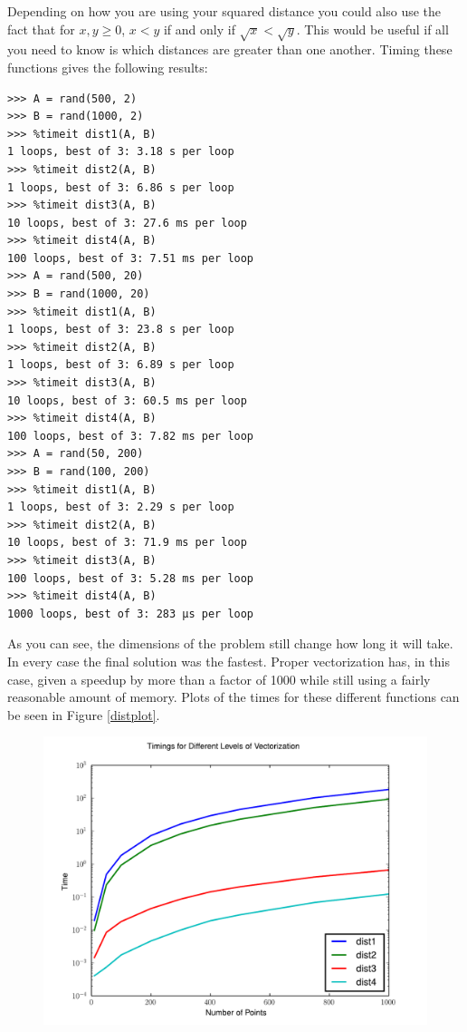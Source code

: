 Depending on how you are using your squared distance you could also use the fact that for $x, y \geq 0$, $x < y$ if and only if $\sqrt{x} < \sqrt{y}$.
This would be useful if all you need to know is which distances are greater than one another.
Timing these functions gives the following results:
\begin{lstlisting}
>>> A = rand(500, 2)
>>> B = rand(1000, 2)
>>> %timeit dist1(A, B)
1 loops, best of 3: 3.18 s per loop
>>> %timeit dist2(A, B)
1 loops, best of 3: 6.86 s per loop
>>> %timeit dist3(A, B)
10 loops, best of 3: 27.6 ms per loop
>>> %timeit dist4(A, B)
100 loops, best of 3: 7.51 ms per loop
>>> A = rand(500, 20)
>>> B = rand(1000, 20)
>>> %timeit dist1(A, B)
1 loops, best of 3: 23.8 s per loop
>>> %timeit dist2(A, B)
1 loops, best of 3: 6.89 s per loop
>>> %timeit dist3(A, B)
10 loops, best of 3: 60.5 ms per loop
>>> %timeit dist4(A, B)
100 loops, best of 3: 7.82 ms per loop
>>> A = rand(50, 200)
>>> B = rand(100, 200)
>>> %timeit dist1(A, B)
1 loops, best of 3: 2.29 s per loop
>>> %timeit dist2(A, B)
10 loops, best of 3: 71.9 ms per loop
>>> %timeit dist3(A, B)
100 loops, best of 3: 5.28 ms per loop
>>> %timeit dist4(A, B)
1000 loops, best of 3: 283 µs per loop
\end{lstlisting}
As you can see, the dimensions of the problem still change how long it will take.
In every case the final solution was the fastest.
Proper vectorization has, in this case, given a speedup by more than a factor of 1000 while still using a fairly reasonable amount of memory.
Plots of the times for these different functions can be seen in Figure \ref{distplot}.

\begin{figure}
\includegraphics[width=\textwidth]{distplot.pdf}
\label{A plot of the times for the different degrees of vectorization for a function finding the distance between points represented as rows in two arrays.}
\end{figure}

